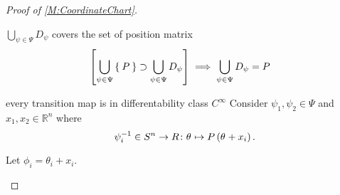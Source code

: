 \documentclass[../methodology.tex]{subfiles}
\begin{document}
\begin{proof}[Proof of \cref{M:CoordinateChart}]
\begin{subproof}{\(\bigcup_{\psi\in\Psi} D_\psi\) covers the set of position matrix}
\begin{align*}
            \left[
                \bigcup_{\psi\in\Psi}\Set{P} \supset \bigcup_{\psi\in\Psi}D_\psi
                \right]
                    & \implies \bigcup_{\psi\in\Psi}D_\psi = P
        \end{align*}
    \end{subproof}
    \begin{subproof}{every transition map is in differentability class \(C^\infty\)}
        Consider \(\psi_1,\psi_2\in\Psi\) and \(x_1, x_2\in\mathbb{R}^n\) where
        \begin{equation*}
            \psi_i^{-1}
            \in S^n\to R
            \colon\tensor{\theta}{}\mapsto P\left(\tensor{\theta}{}+x_i\right)
            \text{.}
        \end{equation*}

        Let \(\phi_i =\theta_i+x_i\).


\end{subproof}
\end{proof}
\end{document}
